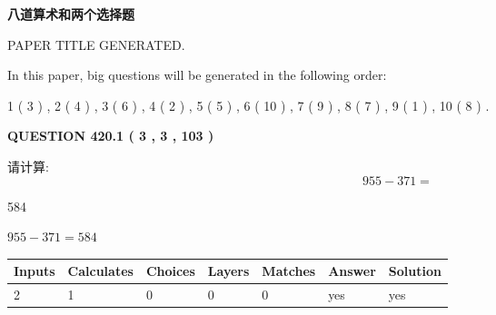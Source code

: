 \documentclass{ctexart}
\begin{document}
   
   
   
   
   
 \vspace{0.2in}
{\LARGE {\textbf{ 八道算术和两个选择题}}}
   
   
 PAPER TITLE GENERATED.
   
   
   
\vspace{0.2in}
   
In this paper, big questions will be generated in the following order: 
   
   
   1 ( 3 )
 ,
   2 ( 4 )
 ,
   3 ( 6 )
 ,
   4 ( 2 )
 ,
   5 ( 5 )
 ,
   6 ( 10 )
 ,
   7 ( 9 )
 ,
   8 ( 7 )
 ,
   9 ( 1 )
 ,
   10 ( 8 )
 .
  
\vspace{0.2in}
  
{\textbf{\Large{QUESTION
420.1 
 ( 3 , 3 , 103 )
}}}
  
  
 
请计算:
\begin{equation}
955 -   %
371 = \nonumber
\end{equation}
 
 
 
\noindent{}
 
 

584
 
 
\noindent{}
 
 

 
 
 
\noindent{}
 
 

$ %
955 -  %
371=   %
584$
 
 
\noindent{}
 
 

 
   
   
   
   
\noindent\begin{tabular}{|l|l|l|l|l|l|l|}
 \hline
Inputs & Calculates & Choices & Layers & Matches & Answer & Solution \\ \hline
 2  & 
 1  & 
 0
  & 
 0  & 
 0  & 
  yes & 
  yes 
  \\ \hline
 \end{tabular}
   
\end{document}
